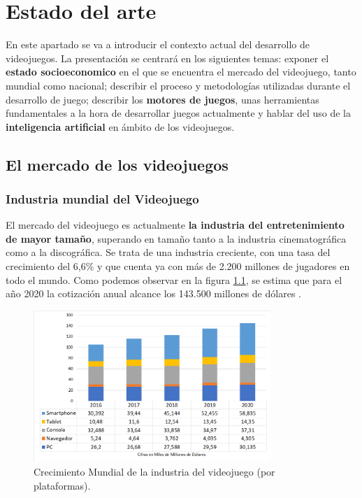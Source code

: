 \chapter{Estado del arte}
\label{chap:estado del arte}
En este apartado se va a introducir el contexto actual del desarrollo de videojuegos. La presentación se centrará en los siguientes temas: exponer el \textbf{estado socioeconomico} en el que se encuentra el mercado del videojuego, tanto mundial como nacional; describir el proceso y metodologías utilizadas durante el desarrollo de juego; describir los \textbf{motores de juegos}, unas herramientas fundamentales a la hora de desarrollar juegos actualmente y hablar del uso de la \textbf{inteligencia artificial} en ámbito de los videojuegos.
 
\section{El mercado de los videojuegos}
\subsection{Industria mundial del Videojuego}
El mercado del videojuego es actualmente \textbf{la industria del entretenimiento de mayor tamaño}, superando en tamaño tanto a la industria cinematográfica como a la discográfica. Se trata de una industria creciente, con una tasa del crecimiento del 6,6\% y que cuenta ya con más de 2.200 millones de jugadores en todo el mundo. Como podemos observar en la figura \ref{crecimiento_mercado_plataforma}, se estima que para el año 2020 la cotización anual alcance los 143.500 millones de dólares \cite{libro_blanco}.

\begin{figure}[h]
    \centering
    \includegraphics[width=0.8\textwidth]{images/estadodelarte/mercado/crecimiento_mercado_plataforma}
    \caption{Crecimiento Mundial de la industria del videojuego (por plataformas).}
    \label{crecimiento_mercado_plataforma}
\end{figure}

